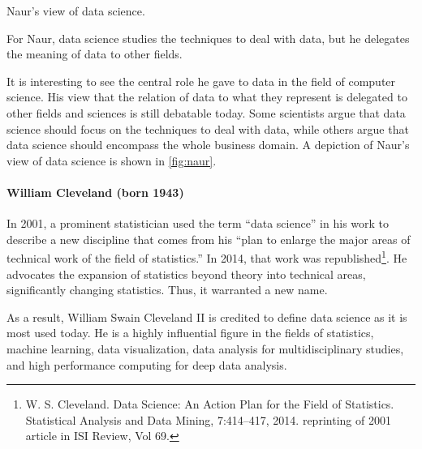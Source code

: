 \begin{figurebox}[label=fig:naur]{Naur's view of data science.}
  \centering
  \tcblower
    For Naur, data science studies the techniques to deal
    with data, but he delegates the meaning of data to other fields.
\end{figurebox}

It is interesting to see the central role he gave to data in the field of computer
science. His view that the relation of data to what they represent is delegated to other
fields and sciences is still debatable today.  Some scientists argue that data science
should focus on the techniques to deal with data, while others argue that data science
should encompass the whole business domain.  A depiction of Naur's view of data science is
shown in \cref{fig:naur}.

\def\clevelandds{(0,0) circle (20mm)}
\def\clevelandst{(0:-5mm) circle (15mm)}
\def\clevelandde {(2,1) circle (15mm)}
\def\clevelandcs {(2,-1) circle (15mm)}

\paragraph{William Cleveland (born 1943)}

In 2001, a prominent statistician used the term ``data science'' in his work to describe a
new discipline that comes from his ``plan to enlarge the major areas of technical work of
the field of statistics.''
In 2014, that work was republished\footnote{W. S. Cleveland.
Data Science: An Action Plan for the Field of Statistics. Statistical Analysis and Data
Mining, 7:414–417, 2014. reprinting of 2001 article in ISI Review, Vol 69.}.
He advocates the expansion of statistics beyond theory into technical areas, significantly
changing statistics.  Thus, it warranted a new name.

As a result, William Swain Cleveland II is credited to define data science as it is most
used today. He is a highly influential figure in the fields of statistics, machine
learning, data visualization, data analysis for multidisciplinary studies, and high
performance computing for deep data analysis.

